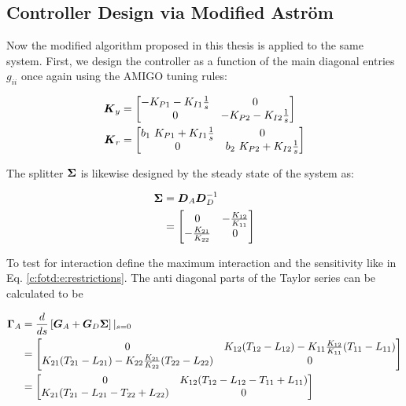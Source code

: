 \subsection*{Controller Design via Modified Astr\"om}

Now the modified algorithm proposed in this thesis is applied to the same system. First, we design the controller as a function of the main diagonal entries $g_{ii}$ once again using the AMIGO tuning rules:

\begin{align}
\begin{split}
\mbox{\boldmath$K$}_y &= \begin{bmatrix}
-K_{P1} - K_{I1}\frac{1}{s} & 0 \\
0 & -K_{P2} - K_{I2}\frac{1}{s}
\end{bmatrix} \\
\mbox{\boldmath$K$}_r &= \begin{bmatrix}
b_1~K_{P1} + K_{I1}\frac{1}{s} & 0 \\
0 & b_2~K_{P2} + K_{I2}\frac{1}{s}
\end{bmatrix}
\end{split}
\label{c:fotd:e:exampleControler}
\end{align}

The splitter $\mbox{\boldmath$\Sigma$}$ is likewise designed by the steady state of the system as:

\begin{align}
\begin{split}
\mbox{\boldmath$\Sigma$} &= \mbox{\boldmath$D$}_A\mbox{\boldmath$D$}_D^{-1} \\
& = \begin{bmatrix}
0 & -\frac{K_{12}}{K_{11}} \\
-\frac{K_{21}}{K_{22}} & 0
\end{bmatrix}
\end{split}
\end{align}

To test for interaction define the maximum interaction and the sensitivity like in Eq. \ref{c:fotd:e:restrictions}. The anti diagonal parts of the Taylor series can be calculated to be

\begin{align}
\begin{split}
\mbox{\boldmath$\Gamma$}_A &= \frac{d}{ds}\left[\mbox{\boldmath$G$}_A + \mbox{\boldmath$G$}_D\mbox{\boldmath$\Sigma$}\right]|_{s=0} \\
&= \begin{bmatrix}
0 & K_{12}(T_{12}-L_{12}) - K_{11}\frac{K_{12}}{K_{11}}(T_{11}-L_{11}) \\
K_{21}(T_{21}-L_{21}) - K_{22}\frac{K_{21}}{K_{22}}(T_{22}-L_{22}) & 0 
\end{bmatrix} \\
&= \begin{bmatrix}
0 & K_{12}(T_{12}-L_{12} - T_{11}+L_{11}) \\
K_{21}(T_{21}-L_{21} - T_{22}+L_{22}) & 0 
\end{bmatrix} 
\end{split}
\end{align}

